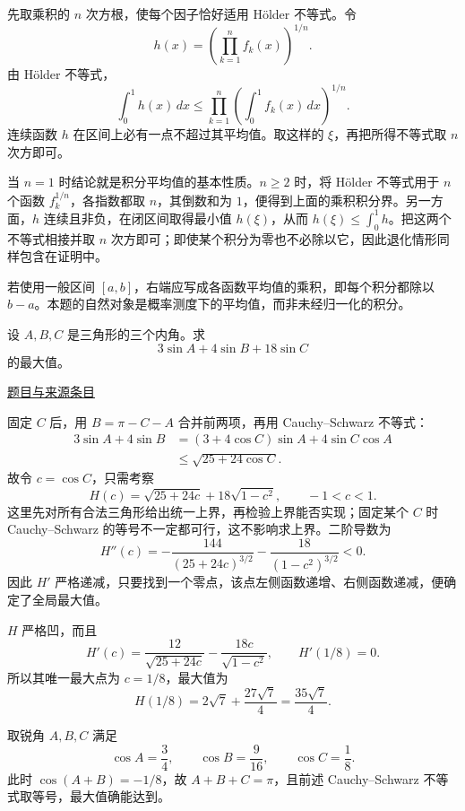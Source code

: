 \documentclass[UTF8,12pt,a4paper,fontset=fandol]{ctexart}
\begin{document}
\begin{solve}\label{ans:pre03-math:2}

先取乘积的 $n$ 次方根，使每个因子恰好适用 Hölder 不等式。令
\[
h(x)=\left(\prod_{k=1}^nf_k(x)\right)^{1/n}.
\]
由 Hölder 不等式，
\[
\int_0^1h(x)\,dx
\le\prod_{k=1}^n\left(\int_0^1f_k(x)\,dx\right)^{1/n}.
\]
连续函数 $h$ 在区间上必有一点不超过其平均值。取这样的 $\xi$，再把所得不等式取 $n$ 次方即可。

当 $n=1$ 时结论就是积分平均值的基本性质。$n\ge2$ 时，将 Hölder 不等式用于 $n$ 个函数 $f_k^{1/n}$，各指数都取 $n$，其倒数和为 $1$，便得到上面的乘积积分界。另一方面，$h$ 连续且非负，在闭区间取得最小值 $h(\xi)$，从而 $h(\xi)\le\int_0^1h$。把这两个不等式相接并取 $n$ 次方即可；即使某个积分为零也不必除以它，因此退化情形同样包含在证明中。

\end{solve}

\begin{remark}[方法与条件]若使用一般区间 $[a,b]$，右端应写成各函数平均值的乘积，即每个积分都除以 $b-a$。本题的自然对象是概率测度下的平均值，而非未经归一化的积分。\end{remark}

\begin{example}[来源序号4]\label{ex:pre03-math:4}\label{pr:pre03-math:4}

设 $A,B,C$ 是三角形的三个内角。求
\[
3\sin A+4\sin B+18\sin C
\]
的最大值。

\par\href{https://github.com/lzxcr/cmc-mathematics/blob/64916fa1fdbc3e444a652eca204d5669058ee321/src/problems/preliminary/03/04.md}{题目与来源条目}

\end{example}

\begin{solve}\label{ans:pre03-math:4}

固定 $C$ 后，用 $B=\pi-C-A$ 合并前两项，再用 Cauchy--Schwarz 不等式：
\[
\begin{aligned}
3\sin A+4\sin B
&=(3+4\cos C)\sin A+4\sin C\cos A\\
&\le\sqrt{25+24\cos C}.
\end{aligned}
\]
故令 $c=\cos C$，只需考察
\[
H(c)=\sqrt{25+24c}+18\sqrt{1-c^2},\qquad -1<c<1.
\]
这里先对所有合法三角形给出统一上界，再检验上界能否实现；固定某个 $C$ 时 Cauchy--Schwarz 的等号不一定都可行，这不影响求上界。二阶导数为
\[
H''(c)=-\frac{144}{(25+24c)^{3/2}}-\frac{18}{(1-c^2)^{3/2}}<0.
\]
因此 $H'$ 严格递减，只要找到一个零点，该点左侧函数递增、右侧函数递减，便确定了全局最大值。

$H$ 严格凹，而且
\[
H'(c)=\frac{12}{\sqrt{25+24c}}-\frac{18c}{\sqrt{1-c^2}},
\qquad H'(1/8)=0.
\]
所以其唯一最大点为 $c=1/8$，最大值为
\[
H(1/8)=2\sqrt7+\frac{27\sqrt7}{4}
=\boxed{\frac{35\sqrt7}{4}}.
\]

取锐角 $A,B,C$ 满足
\[
\cos A=\frac34,\qquad \cos B=\frac9{16},\qquad \cos C=\frac18.
\]
此时 $\cos(A+B)=-1/8$，故 $A+B+C=\pi$，且前述 Cauchy--Schwarz 不等式取等号，最大值确能达到。

\end{solve}
\end{document}
